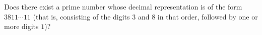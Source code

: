 Does there exist a prime number whose decimal representation is of the form $3811\cdots11$ (that is, consisting of the digits $3$ and $8$ in that order, followed by one or more digits $1$)?